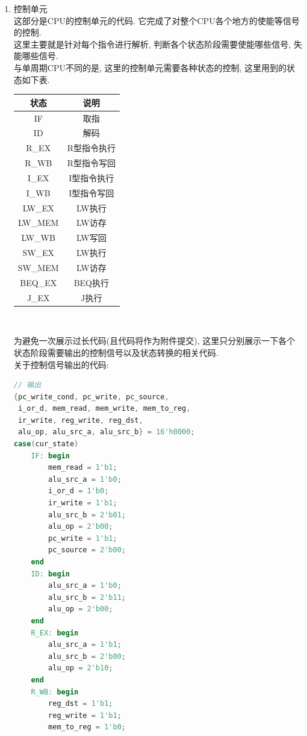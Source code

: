 \documentclass[UTF8]{article}
\newcommand{\jumpLine} {\hspace*{\fill} \par}
\begin{document}
\begin{enumerate}
	\item 控制单元\\
	这部分是CPU的控制单元的代码. 它完成了对整个CPU各个地方的使能等信号的控制.\\
	这里主要就是针对每个指令进行解析, 判断各个状态阶段需要使能哪些信号, 失能哪些信号.\\
	与单周期CPU不同的是, 这里的控制单元需要各种状态的控制, 这里用到的状态如下表.\\
	\jumpLine
	\begin{tabular}{|c|c|}
	\hline
	状态 & 说明 \\
	\hline
	IF & 取指 \\
	\hline
	ID & 解码 \\
	\hline
	R\_EX & R型指令执行 \\
	\hline
	R\_WB & R型指令写回 \\
	\hline
	I\_EX & I型指令执行 \\
	\hline
	I\_WB & I型指令写回 \\
	\hline
	LW\_EX & LW执行 \\
	\hline
	LW\_MEM & LW访存 \\
	\hline
	LW\_WB & LW写回 \\
	\hline
	SW\_EX & LW执行 \\
	\hline
	SW\_MEM & LW访存 \\
	\hline
	BEQ\_EX & BEQ执行 \\
	\hline
	J\_EX & J执行 \\
	\hline
	\end{tabular}\\
	\jumpLine
	为避免一次展示过长代码(且代码将作为附件提交), 这里只分别展示一下各个状态阶段需要输出的控制信号以及状态转换的相关代码.\\
	关于控制信号输出的代码:\\
	\begin{lstlisting}[language=verilog]
// 输出
{pc_write_cond, pc_write, pc_source,
 i_or_d, mem_read, mem_write, mem_to_reg,
 ir_write, reg_write, reg_dst,
 alu_op, alu_src_a, alu_src_b} = 16'h0000;
case(cur_state)
    IF: begin
        mem_read = 1'b1;
        alu_src_a = 1'b0;
        i_or_d = 1'b0;
        ir_write = 1'b1;
        alu_src_b = 2'b01;
        alu_op = 2'b00;
        pc_write = 1'b1;
        pc_source = 2'b00;
    end
    ID: begin
        alu_src_a = 1'b0;
        alu_src_b = 2'b11;
        alu_op = 2'b00;
    end
    R_EX: begin
        alu_src_a = 1'b1;
        alu_src_b = 2'b00;
        alu_op = 2'b10;
    end
    R_WB: begin
        reg_dst = 1'b1;
        reg_write = 1'b1;
        mem_to_reg = 1'b0;

\end{lstlisting}
\end{enumerate}
\end{document}
